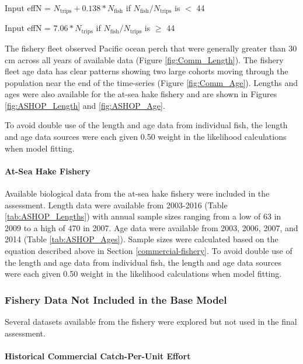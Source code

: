 \documentclass[12pt,]{article}
\let\oldparagraph\paragraph
\renewcommand{\paragraph}[1]{\oldparagraph{#1}\mbox{}}
\begin{document}
\begin{centering}

Input effN = $N_{\text{trips}} + 0.138 * N_{\text{fish}}$ if $N_{\text{fish}}/N_{\text{trips}}$ is $<$ 44

Input effN = $7.06 * N_{\text{trips}}$ if $N_{\text{fish}}/N_{\text{trips}}$ is $\geq$ 44

\end{centering}

The fishery fleet observed Pacific ocean perch that were generally
greater than 30 cm across all years of available data (Figure
\ref{fig:Comm_Length}). The fishery fleet age data has clear patterns
showing two large cohorts moving through the population near the end of
the time-series (Figure \ref{fig:Comm_Age}). Lengths and ages were also
available for the at-sea hake fishery and are shown in Figures
\ref{fig:ASHOP_Length} and \ref{fig:ASHOP_Age}.

To avoid double use of the length and age data from individual fish, the
length and age data sources were each given 0.50 weight in the
likelihood calculations when model fitting.

\paragraph{At-Sea Hake Fishery}\label{at-sea-hake-fishery}

Available biological data from the at-sea hake fishery were included in
the assessment. Length data were available from 2003-2016 (Table
\ref{tab:ASHOP_Lengths}) with annual sample sizes ranging from a low of
63 in 2009 to a high of 470 in 2007. Age data were available from 2003,
2006, 2007, and 2014 (Table \ref{tab:ASHOP_Ages}). Sample sizes were
calculated based on the equation described above in Section
\ref{commercial-fishery}. To avoid double use of the length and age data
from individual fish, the length and age data sources were each given
0.50 weight in the likelihood calculations when model fitting.

\subsubsection{Fishery Data Not Included in the Base
Model}\label{fishery-data-not-included-in-the-base-model}

Several datasets available from the fishery were explored but not used
in the final assessment.

\paragraph{Historical Commercial Catch-Per-Unit
Effort}\label{historical-commercial-catch-per-unit-effort}
\end{document}
